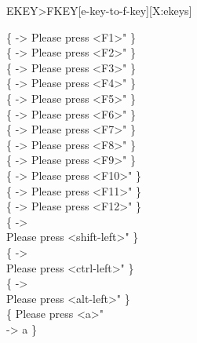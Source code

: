 \begin{worddef*}[EKEYtoFKEY]{}{EKEY>FKEY}[e-key-to-f-key][X:ekeys]
\begin{defer}
		\{      ->   Please press <F1>"      \} \\
		\{      ->   Please press <F2>"      \} \\
		\{      ->   Please press <F3>"      \} \\
		\{      ->   Please press <F4>"      \} \\
		\{      ->   Please press <F5>"      \} \\
		\{      ->   Please press <F6>"      \} \\
		\{      ->   Please press <F7>"      \} \\
		\{      ->   Please press <F8>"      \} \\
		\{      ->   Please press <F9>"      \} \\
		\{     ->   Please press <F10>"     \} \\
		\{     ->   Please press <F11>"     \} \\
		\{     ->   Please press <F12>"     \} \\

		\{     -> \\
		\tab {}  Please press <shift-left>"   \} \\
		\{      -> \\
		\tab {}  Please press <ctrl-left>"    \} \\
		\{       -> \\
		\tab {}  Please press <alt-left>"     \} \\

		\{   Please press <a>"      \\
		\tab ->   a  \}
	\end{defer}
\end{worddef*}


